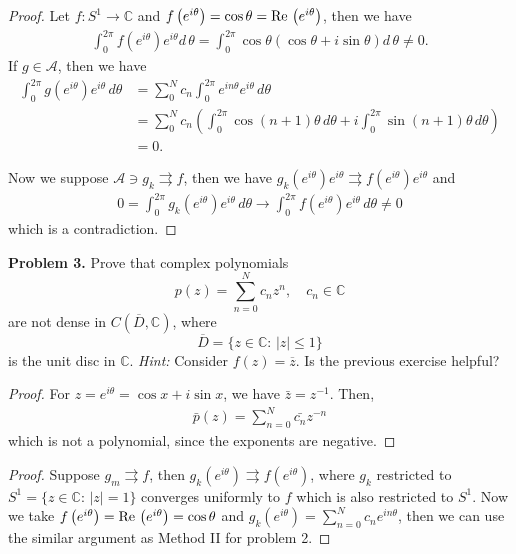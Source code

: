 \documentclass[12pt]{article}
\theoremstyle{definition}
\theoremstyle{definition}
\numberwithin{equation}{subsection}
\begin{document}
\begin{proof}
Let $f:S^1 \to \mathbb{C}$ and $f\left(e^{i\theta} \right) = \cos \theta = {\rm Re}\, \left(e^{i\theta} \right)$, then we have
\begin{align*}
    \int^{2\pi}_0 f\left(e^{i\theta} \right)e^{i\theta} d\, \theta = \int^{2\pi}_0 \cos \theta (\cos \theta + i \sin \theta) d\, \theta \neq 0.
\end{align*}
If $g\in \mathcal{A}$, then we have 
\begin{align*}
    \int_0^{2\pi} g\left(e^{i\theta}\right)e^{i\theta}\, d\theta & = \sum^N_0 c_n \int^{2\pi}_0 e^{in\theta} e^{i\theta} \, d\theta \\
    & = \sum^N_0 c_n \left(\int^{2\pi}_0 \cos(n+1)\theta \, d\theta + i \int^{2\pi}_0 \sin(n+1)\theta \, d\theta \right) \\
    & = 0.
\end{align*}

Now we suppose $\mathcal{A}\ni g_k \rightrightarrows f$, then we have $g_k\left(e^{i\theta}\right) e^{i\theta} \rightrightarrows f\left(e^{i\theta}\right) e^{i\theta}$ and 
\begin{align*}
    0 = \int^{2\pi}_0 g_k\left(e^{i\theta}\right) e^{i\theta} \, d\theta \to \int^{2\pi}_0 f\left(e^{i\theta}\right) e^{i\theta} \, d\theta \neq 0
\end{align*}
which is a contradiction. 
\end{proof}

\medskip


\noindent
{\bf Problem 3.}
Prove that complex polynomials
$$
p(z) = \sum_{n=0}^N c_n z^n,
\quad
c_n\in\mathbb{C}
$$
are not dense in $C(\overline{D},\mathbb{C})$, where
$$
\overline{D} = \{ z\in\mathbb{C}:\, |z|\leq 1\}
$$
is the unit disc in $\mathbb{C}$.
{\em Hint:} Consider $f(z)=\overline{z}$. Is the previous exercise
helpful?
\begin{proof}
For $z = e^{i\theta} = \cos x + i\sin x$, we have $\bar{z} = z^{-1}$. Then, 
\begin{align*}
    \bar{p}(z) = \sum^N_{n=0} \bar{c_n} z^{-n}
\end{align*}
which is not a polynomial, since the exponents are negative.
\end{proof}

\begin{proof}
Suppose $g_m \rightrightarrows f$, then $g_k\left(e^{i\theta}\right) \rightrightarrows f\left(e^{i\theta}\right)$, where $g_k$ restricted to $S^1 = \{ z\in\mathbb{C}:\, |z|=1\}$ converges uniformly to $f$ which is also restricted to $S^1$. Now we take $f\left(e^{i\theta}\right) = {\rm Re}\,\left(e^{i\theta}\right) = \cos \theta$ and $g_k\left(e^{i\theta}\right) = \sum^N_{n=0}c_n e^{in\theta}$, then we can use the similar argument as Method II for problem 2.
\end{proof}
\end{document}
